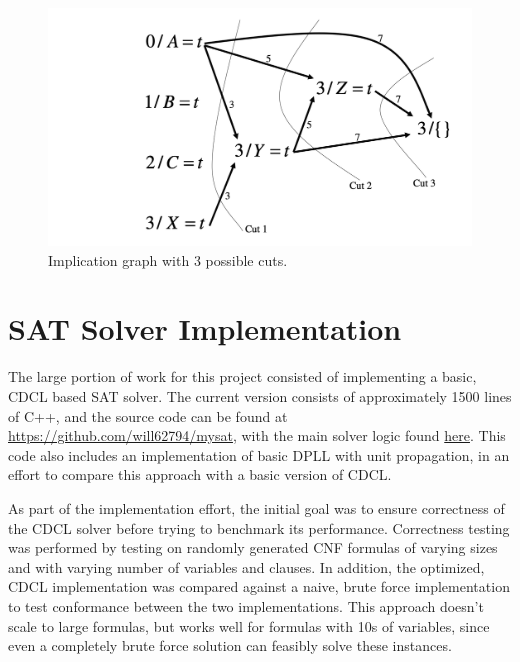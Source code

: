 \documentclass[12pt]{article}
\begin{document}
\begin{figure}
    \begin{center}
        \includegraphics[scale=0.4]{figures/impl-graph.png}
    \end{center}
    \caption{Implication graph with 3 possible cuts.}
    \label{fig:impl-graph}
\end{figure}

\section{SAT Solver Implementation}

The large portion of work for this project consisted of implementing a basic, CDCL based SAT solver. The current version consists of approximately 1500 lines of C++, and the source code can be found at \url{https://github.com/will62794/mysat}, with the main solver logic found \href{https://github.com/will62794/mysat/blob/b721cb133098fd795219caa115cbae1cedf95ee2/sat.cpp}{here}. This code also includes an implementation of basic DPLL with unit propagation, in an effort to compare this approach with a basic version of CDCL.

As part of the implementation effort, the initial goal was to ensure correctness of the CDCL solver before trying to benchmark its performance. Correctness testing was performed by testing on randomly generated CNF formulas of varying sizes and with varying number of variables and clauses. In addition, the optimized, CDCL implementation was compared against a naive, brute force implementation to test conformance between the two implementations. This approach doesn't scale to large formulas, but works well for formulas with 10s of variables, since even a completely brute force solution can feasibly solve these instances.
\end{document}
